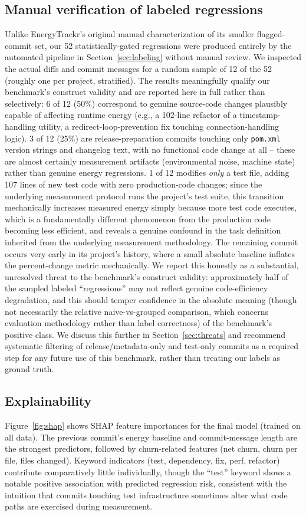 \documentclass[preprint,12pt]{elsarticle}
\begin{document}
\subsection{Manual verification of labeled regressions}
\label{sec:manualcheck}
Unlike EnergyTrackr's original manual characterization of its smaller flagged-commit set, our 52 statistically-gated regressions were produced entirely by the automated pipeline in Section~\ref{sec:labeling} without manual review. We inspected the actual diffs and commit messages for a random sample of 12 of the 52 (roughly one per project, stratified). The results meaningfully qualify our benchmark's construct validity and are reported here in full rather than selectively: 6 of 12 (50\%) correspond to genuine source-code changes plausibly capable of affecting runtime energy (e.g., a 102-line refactor of a timestamp-handling utility, a redirect-loop-prevention fix touching connection-handling logic). 3 of 12 (25\%) are release-preparation commits touching only \texttt{pom.xml} version strings and changelog text, with no functional code change at all -- these are almost certainly measurement artifacts (environmental noise, machine state) rather than genuine energy regressions. 1 of 12 modifies \emph{only} a test file, adding 107 lines of new test code with zero production-code changes; since the underlying measurement protocol runs the project's test suite, this transition mechanically increases measured energy simply because more test code executes, which is a fundamentally different phenomenon from the production code becoming less efficient, and reveals a genuine confound in the task definition inherited from the underlying measurement methodology. The remaining commit occurs very early in its project's history, where a small absolute baseline inflates the percent-change metric mechanically. We report this honestly as a substantial, unresolved threat to the benchmark's construct validity: approximately half of the sampled labeled ``regressions'' may not reflect genuine code-efficiency degradation, and this should temper confidence in the absolute meaning (though not necessarily the relative naive-vs-grouped comparison, which concerns evaluation methodology rather than label correctness) of the benchmark's positive class. We discuss this further in Section~\ref{sec:threats} and recommend systematic filtering of release/metadata-only and test-only commits as a required step for any future use of this benchmark, rather than treating our labels as ground truth.
\subsection{Explainability}
Figure~\ref{fig:shap} shows SHAP feature importances for the final model (trained on all data). The previous commit's energy baseline and commit-message length are the strongest predictors, followed by churn-related features (net churn, churn per file, files changed). Keyword indicators (test, dependency, fix, perf, refactor) contribute comparatively little individually, though the ``test'' keyword shows a notable positive association with predicted regression risk, consistent with the intuition that commits touching test infrastructure sometimes alter what code paths are exercised during measurement.
\end{document}
